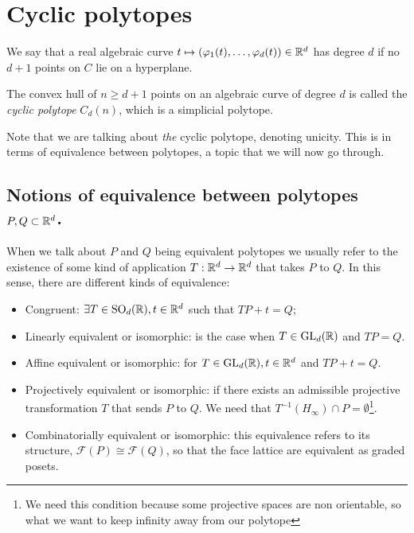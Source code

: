 \chapter{Cyclic polytopes}

 
\begin{remark}
We say that a real algebraic curve $t \mapsto (\varphi_1(t), \dots, \varphi_d(t))\in \mathbb{R}^d$ has degree $d$ if no $d+1$ points on $C$ lie on a hyperplane.
\end{remark}

\begin{theorem}
The convex hull of $n\geq d+1$ points on an algebraic curve of degree $d$ is called the \emph{cyclic polytope} $C_d(n)$, which is a simplicial polytope.
\end{theorem}

Note that we are talking about \emph{the} cyclic polytope, denoting unicity. This is in terms of equivalence between polytopes, a topic that we will now go through.

\section{Notions of equivalence between polytopes $P, Q\subset \mathbb{R}^d$.}

When we talk about $P$ and $Q$ being equivalent polytopes we usually refer to the existence of some kind of application $T:\mathbb{R}^d \to \mathbb{R}^d$ that takes $P$ to $Q$. In this sense, there are different kinds of equivalence:

\begin{itemize}
\item Congruent: $\exists T\in \operatorname{SO}_d(\mathbb{R}), t\in\mathbb{R}^d$ such that $TP + t = Q$;
\item Linearly equivalent or isomorphic: is the case when $T\in \operatorname{GL}_d(\mathbb{R})$ and $TP = Q$.
\item Affine equivalent or isomorphic: for $T\in\operatorname{GL}_d(\mathbb{R}), t\in\mathbb{R}^d$ and $TP + t = Q$.
\item Projectively equivalent or isomorphic: if there exists an admissible projective transformation $T$ that sends $P$ to $Q$. We need that $T^{-1}(H_\infty) \cap P = \emptyset$\footnote{We need this condition because some projective spaces are non orientable, so what we want to keep infinity away from our polytope}.
\item Combinatorially equivalent or isomorphic: this equivalence refers to its structure, \break $\mathcal{F}(P) \cong \mathcal{F}(Q)$, so that the face lattice are equivalent as graded posets.
\end{itemize}

